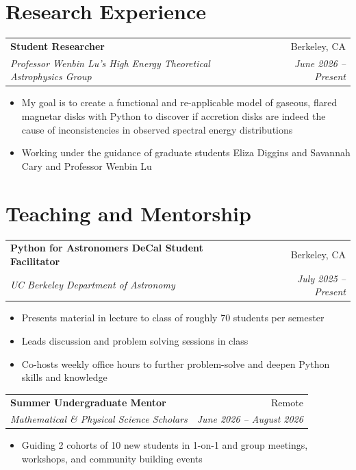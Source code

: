 \documentclass[a4paper,12pt]{article}
\makeatletter
\newenvironment{experience}[4]
    {
    \begin{tabularx}{\linewidth}{@{}X r@{}}
    \textbf{#1} & #3 \\
    \textit{#2} & \textit{#4} \\[-1pt]
    \end{tabularx}
    \begin{minipage}[t]{\linewidth}
    \begin{itemize}[nosep,after=\strut,leftmargin=1em,itemsep=3pt,label=\textopenbullet]
    }
    {
    \end{itemize}
    \end{minipage}
    }
\makeatother
\begin{document}
\section{Research Experience}

\begin{experience}
{Student Researcher}
{Professor Wenbin Lu's High Energy Theoretical Astrophysics Group}
{Berkeley, CA}
{June 2026 -- Present}

\item My goal is to create a functional and re-applicable model of gaseous, flared magnetar disks with Python to discover if accretion disks are indeed the cause of inconsistencies in observed spectral energy distributions

\item Working under the guidance of graduate students Eliza Diggins and Savannah Cary and Professor Wenbin Lu

\end{experience}

\section{Teaching and Mentorship}

\begin{experience}
{Python for Astronomers DeCal Student Facilitator}
{UC Berkeley Department of Astronomy}
{Berkeley, CA}
{July 2025 -- Present}

\item Presents material in lecture to class of roughly 70 students per semester

\item Leads discussion and problem solving sessions in class

\item Co-hosts weekly office hours to further problem-solve and deepen Python skills and knowledge

\end{experience}

\begin{experience}
{Summer Undergraduate Mentor}
{Mathematical \& Physical Science Scholars}
{Remote}
{June 2026 -- August 2026}

\item Guiding 2 cohorts of 10 new students in 1-on-1 and group meetings, workshops, and community building events

\end{experience}
\end{document}
